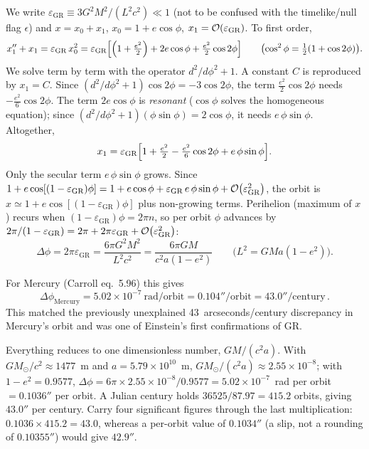 \begin{derivation}
We write $\varepsilon_{\mathrm{GR}} \equiv 3G^2M^2/(L^2c^2) \ll 1$ (not to be
confused with the timelike/null flag $\epsilon$) and
$x = x_0 + x_1$, $x_0 = 1 + e\cos\phi$, $x_1 = \mathcal{O}\!\left(\varepsilon_{\mathrm{GR}}\right)$.
To first order,
\[
x_1'' + x_1 = \varepsilon_{\mathrm{GR}}\,x_0^2
= \varepsilon_{\mathrm{GR}}\Bigl[\Bigl(1 + \tfrac{e^2}{2}\Bigr)
  + 2e\cos\phi + \tfrac{e^2}{2}\cos2\phi\Bigr]
\qquad \bigl(\cos^2\phi = \tfrac12(1 + \cos2\phi)\bigr).
\]
We solve term by term with the operator $d^2/d\phi^2 + 1$.
A constant $C$ is reproduced by $x_1 = C$.
Since $(d^2/d\phi^2 + 1)\cos2\phi = -3\cos2\phi$,
the term $\tfrac{e^2}{2}\cos2\phi$ needs $-\tfrac{e^2}{6}\cos2\phi$.
The term $2e\cos\phi$ is \emph{resonant} ($\cos\phi$ solves the homogeneous
equation); since $(d^2/d\phi^2 + 1)(\phi\sin\phi) = 2\cos\phi$, it
needs $e\,\phi\sin\phi$.  Altogether,
\[
x_1 = \varepsilon_{\mathrm{GR}}\Bigl[1 + \tfrac{e^2}{2}
      - \tfrac{e^2}{6}\cos2\phi + e\,\phi\sin\phi\Bigr] .
\]
Only the secular term $e\,\phi\sin\phi$ grows.  Since
$1 + e\cos[(1 - \varepsilon_{\mathrm{GR}})\phi]
= 1 + e\cos\phi + \varepsilon_{\mathrm{GR}}\,e\,\phi\sin\phi + \mathcal{O}\!\left(\varepsilon_{\mathrm{GR}}^2\right)$,
the orbit is $x \simeq 1 + e\cos[(1 - \varepsilon_{\mathrm{GR}})\phi]$
plus non-growing terms.  Perihelion (maximum of $x$) recurs when
$(1 - \varepsilon_{\mathrm{GR}})\phi = 2\pi n$, so per orbit $\phi$ advances by
$2\pi/(1 - \varepsilon_{\mathrm{GR}}) = 2\pi + 2\pi\varepsilon_{\mathrm{GR}}
+ \mathcal{O}\!\left(\varepsilon_{\mathrm{GR}}^2\right)$:
\[
\Delta\phi = 2\pi\varepsilon_{\mathrm{GR}} = \frac{6\pi G^2M^2}{L^2c^2}
= \frac{6\pi GM}{c^2a(1 - e^2)}
\qquad \bigl(L^2 = GMa(1 - e^2)\bigr).
\]
\end{derivation}


For Mercury (Carroll eq.~5.96) this gives
\begin{equation}
    \Delta\phi_{\mathrm{Mercury}} = 5.02 \times 10^{-7}~\text{rad/orbit}
    = 0.104''\text{/orbit} = 43.0''\text{/century} \,.
    \label{eq:mercury_precession}
\end{equation}
This matched the previously unexplained 43~arcseconds/century discrepancy
in Mercury's orbit and was one of Einstein's first confirmations of GR.

\begin{annotation}
Everything reduces to one dimensionless number, $GM/(c^2a)$.  With
$GM_\odot/c^2 \approx 1477$~m and $a = 5.79\times10^{10}$~m,
$GM_\odot/(c^2a) \approx 2.55\times10^{-8}$; with $1 - e^2 = 0.9577$,
$\Delta\phi = 6\pi\times2.55\times10^{-8}/0.9577 = 5.02\times10^{-7}$~rad per
orbit $= 0.1036''$ per orbit.  A Julian century holds
$36525/87.97 = 415.2$ orbits, giving $43.0''$ per century.  Carry four
significant figures through the last multiplication:
$0.1036\times415.2 = 43.0$, whereas a per-orbit value of $0.1034''$ (a slip,
not a rounding of $0.10355''$) would give $42.9''$.
\end{annotation}


